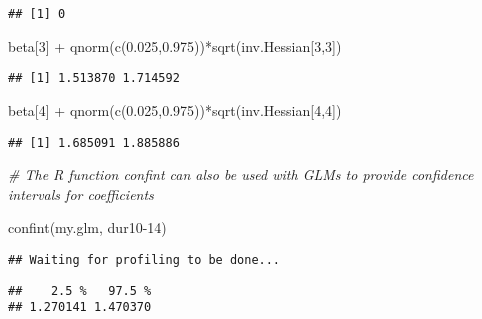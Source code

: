 \documentclass[
]{book}
\newenvironment{Shaded}{\begin{snugshade}}{\end{snugshade}}
\newcommand{\CommentTok}[1]{\textcolor[rgb]{0.56,0.35,0.01}{\textit{#1}}}
\newcommand{\DecValTok}[1]{\textcolor[rgb]{0.00,0.00,0.81}{#1}}
\newcommand{\FloatTok}[1]{\textcolor[rgb]{0.00,0.00,0.81}{#1}}
\newcommand{\FunctionTok}[1]{\textcolor[rgb]{0.00,0.00,0.00}{#1}}
\newcommand{\NormalTok}[1]{#1}
\newcommand{\SpecialCharTok}[1]{\textcolor[rgb]{0.00,0.00,0.00}{#1}}
\newcommand{\StringTok}[1]{\textcolor[rgb]{0.31,0.60,0.02}{#1}}
\begin{document}
\begin{verbatim}
## [1] 0
\end{verbatim}

\begin{Shaded}
\begin{Highlighting}[]
\NormalTok{beta[}\DecValTok{3}\NormalTok{] }\SpecialCharTok{+} \FunctionTok{qnorm}\NormalTok{(}\FunctionTok{c}\NormalTok{(}\FloatTok{0.025}\NormalTok{,}\FloatTok{0.975}\NormalTok{))}\SpecialCharTok{*}\FunctionTok{sqrt}\NormalTok{(inv.Hessian[}\DecValTok{3}\NormalTok{,}\DecValTok{3}\NormalTok{])}
\end{Highlighting}
\end{Shaded}

\begin{verbatim}
## [1] 1.513870 1.714592
\end{verbatim}

\begin{Shaded}
\begin{Highlighting}[]
\NormalTok{beta[}\DecValTok{4}\NormalTok{] }\SpecialCharTok{+} \FunctionTok{qnorm}\NormalTok{(}\FunctionTok{c}\NormalTok{(}\FloatTok{0.025}\NormalTok{,}\FloatTok{0.975}\NormalTok{))}\SpecialCharTok{*}\FunctionTok{sqrt}\NormalTok{(inv.Hessian[}\DecValTok{4}\NormalTok{,}\DecValTok{4}\NormalTok{])}
\end{Highlighting}
\end{Shaded}

\begin{verbatim}
## [1] 1.685091 1.885886
\end{verbatim}

\begin{Shaded}
\begin{Highlighting}[]
\CommentTok{\# The R function confint can also be used with GLMs to provide confidence intervals for coefficients}

\FunctionTok{confint}\NormalTok{(my.glm, }\StringTok{\textquotesingle{}dur10{-}14\textquotesingle{}}\NormalTok{)}
\end{Highlighting}
\end{Shaded}

\begin{verbatim}
## Waiting for profiling to be done...
\end{verbatim}

\begin{verbatim}
##    2.5 %   97.5 % 
## 1.270141 1.470370
\end{verbatim}
\end{document}
